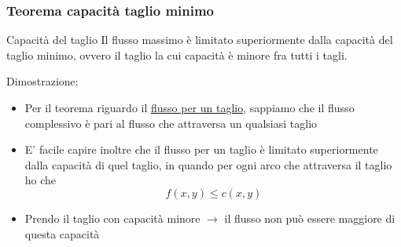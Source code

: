 \subsubsection{Teorema capacità taglio minimo}
\begin{teorema}{Capacità del taglio}
	Il flusso massimo è limitato superiormente dalla capacità del taglio minimo, ovvero il taglio la cui capacità è minore fra tutti i tagli.
\end{teorema}
Dimostrazione:
\begin{itemize}
	\item Per il teorema riguardo il \hyperref[flusso per taglio]{flusso per un taglio}, sappiamo che il flusso complessivo è pari al flusso che attraversa un qualsiasi taglio
	\item E' facile capire inoltre che il flusso per un taglio è limitato superiormente dalla capacità di quel taglio, in quando per ogni arco che attraversa il taglio ho che
	      \[
		      f\left(x,y\right) \le c\left(x,y\right)
	      \]
	\item Prendo il taglio con capacità minore $ \rightarrow  $ il flusso non può essere maggiore di questa capacità
\end{itemize}
